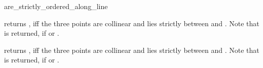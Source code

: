 \begin{ccRefFunction}{are_strictly_ordered_along_line}

         {returns , iff the three points are collinear and 
           lies strictly between  and .
          Note that  is returned, if  or
          .}

         {returns , iff the three points are collinear and 
           lies strictly between  and .
          Note that  is returned, if  or
          .}
\end{ccRefFunction}


